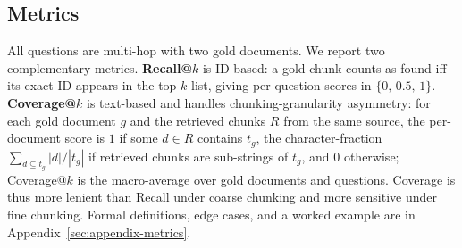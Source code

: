 

\subsection{Metrics}
\label{sec:metrics}

All questions are multi-hop with two gold documents. We report two
complementary metrics. \textbf{Recall@$k$} is ID-based: a gold chunk
counts as found iff its exact ID appears in the top-$k$ list, giving
per-question scores in $\{0,\, 0.5,\, 1\}$. \textbf{Coverage@$k$} is
text-based and handles chunking-granularity asymmetry: for each gold
document $g$ and the retrieved chunks $R$ from the same source, the
per-document score is $1$ if some $d \in R$ contains $t_g$, the
character-fraction $\sum_{d \subseteq t_g}|d|/|t_g|$ if retrieved
chunks are sub-strings of $t_g$, and $0$ otherwise; Coverage@$k$ is
the macro-average over gold documents and questions. Coverage is
thus more lenient than Recall under coarse chunking and more
sensitive under fine chunking. Formal definitions, edge cases, and
a worked example are in Appendix~\ref{sec:appendix-metrics}.
